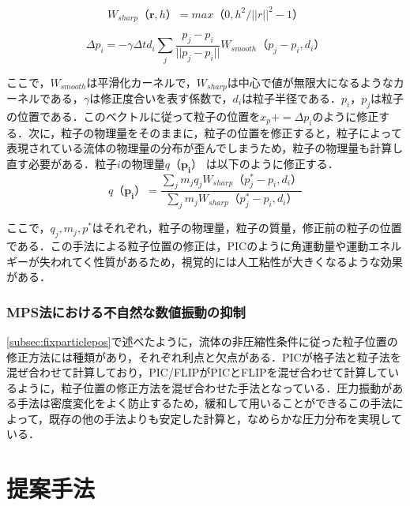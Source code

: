 \documentclass[a4j,12pt]{jreport}
\begin{document}
\begin{equation}\label{eq:w_sharp}
W_{sharp}（\bm{r},h） = max（0,h^2/||r||^2 - 1）
\end{equation} 

\begin{equation}\label{eq:fixVector}
\varDelta p_i = -\gamma \varDelta td_i\sum\limits_j \frac{p_j - p_i}{||p_j - p_i||}W_{smooth}（p_j - p_i,d_i）
\end{equation} 

ここで，$W_{smooth}$は平滑化カーネルで，$W_{sharp}$は中心で値が無限大になるようなカーネルである，$\gamma$は修正度合いを表す係数で，$d_i$は粒子半径である．$p_i$，$p_j$は粒子の位置である．このベクトルに従って粒子の位置を$x_p += \varDelta p_i$のように修正する．次に，粒子の物理量をそのままに，粒子の位置を修正すると，粒子によって表現されている流体の物理量の分布が歪んでしまうため，粒子の物理量も計算し直す必要がある．粒子$i$の物理量$q（\bm{p_i}）$ は以下のように修正する．
\begin{equation}\label{eq:fixVelocity}
q（\bm{p_i}） = \frac{\sum\limits_j m_jq_jW_{sharp}（p^*_j - p_i,d_i）}{\sum\limits_j m_jW_{sharp}（p^*_j - p_i,d_i）}
\end{equation} 

ここで，$q_j,m_j,p^*$はそれぞれ，粒子の物理量，粒子の質量，修正前の粒子の位置である．この手法による粒子位置の修正は，PICのように角運動量や運動エネルギーが失われてく性質があるため，視覚的には人工粘性が大きくなるような効果がある．
\subsection{MPS法における不自然な数値振動の抑制}\label{subsec:japan}
\ref{subsec:fixparticlepos}で述べたように，流体の非圧縮性条件に従った粒子位置の修正方法には種類があり，それぞれ利点と欠点がある．PICが格子法と粒子法を混ぜ合わせて計算しており，PIC/FLIPがPICとFLIPを混ぜ合わせて計算しているように，粒子位置の修正方法を混ぜ合わせた手法となっている．圧力振動がある手法は密度変化をよく防止するため，緩和して用いることができるこの手法によって，既存の他の手法よりも安定した計算と，なめらかな圧力分布を実現している．

\chapter{提案手法} \label{chapter:4}
\end{document}
